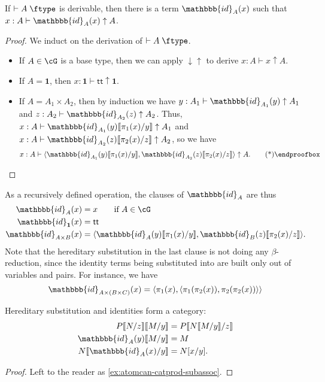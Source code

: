 \documentclass{book}
\let\types\vdash
\def\type{\;\ftype}
\newcommand{\can}{\mathrel{\uparrow}}
\newcommand{\atomcan}{\ensuremath{\mathord{\downarrow\uparrow}}}
\newcommand{\hsub}[1]{\llbracket #1\rrbracket}
\newcommand{\hid}[1]{\mathbbb{id}_{#1}}
\def\unit{\mathbf{1}}
\def\ttt{\mathsf{tt}}
\def\pair#1#2{\langle #1,#2\rangle}
\begin{document}
\begin{lem}\label{thm:catprod-atomcan-idadm}
  If $\types A\type$ is derivable, then there is a term $\hid{A}(x)$ such that $x:A \types \hid{A}(x)\can A$.
\end{lem}
\begin{proof}
  We induct on the derivation of $\types A\type$.
  \begin{itemize}
  \item If $A\in\cG$ is a base type, then we can apply $\atomcan$ to derive $x:A \types x\can A$.
  \item If $A=\unit$, then $x:\unit \types \ttt\can \unit$.
  \item If $A=A_1\times A_2$, then by induction we have $y:A_1 \types \hid{A_1}(y)\can A_1$ and $z:A_2 \types \hid{A_2}(z)\can A_2$.
    Thus, $x:A \types \hid{A_1}(y)\hsub{\pi_1(x)/y}\can A_1$ and $x:A \types \hid{A_2}(z)\hsub{\pi_2(x)/z}\can A_2$, so we have
    \[ x:A \types \pair{\hid{A_1}(y)\hsub{\pi_1(x)/y}}{\hid{A_2}(z)\hsub{\pi_2(x)/z}} \can A.\qedhere\]
  \end{itemize}
\end{proof}

As a recursively defined operation, the clauses of $\hid{A}$ are thus
\begin{align*}
  \hid{A}(x) &= x \qquad\text{if }{A\in\cG}\\
  \hid{\unit}(x) &= \ttt\\
  \hid{A\times B}(x) &= \pair{\hid{A}(y)\hsub{\pi_1(x)/y}}{\hid{B}(z)\hsub{\pi_2(x)/z}}.
\end{align*}
Note that the hereditary substitution in the last clause is not doing any $\beta$-reduction, since the identity terms being substituted into are built only out of variables and pairs.
For instance, we have
\[ \hid{A\times (B\times C)}(x) = \pair{\pi_1(x)}{\pair{\pi_1(\pi_2(x))}{\pi_2(\pi_2(x))}} \]

\begin{lem}\label{thm:atomcan-catprod-subassoc}
  Hereditary substitution and identities form a category:
  \begin{align*}
    P\hsub{N/z}\hsub{M/y} &= P\hsub{N\hsub{M/y}/z}\\
    \hid{A}(y)\hsub{M/y} &= M\\
    N\hsub{\hid{A}(x)/y} &= N[x/y].\thmqedhere
  \end{align*}
\end{lem}
\begin{proof}
  Left to the reader as \cref{ex:atomcan-catprod-subassoc}.
\end{proof}
\end{document}
